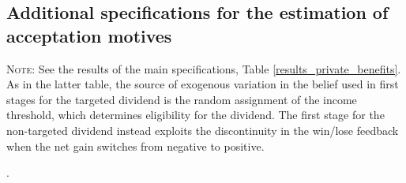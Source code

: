 \documentclass[12pt]{article} %
\begin{document}
\begin{appendices}
\section{Additional specifications for the estimation of acceptation motives \label{subsec:app_motives_other}}

\begin{table}[!htbp] \centering 
  \caption{Effect of self-interest on acceptance: second stages of alternative specifications} 
  \label{tab:alternative_si} 
 {\footnotesize \parbox[t]{\textwidth}{\linespread{1.2}\selectfont \textsc{Note:} See the results of the main specifications, Table \vref{results_private_benefits}. As in the latter table, the source of exogenous variation in the belief used in first stages for the targeted dividend is the random assignment of the income threshold, which determines eligibility for the dividend. The first stage for the non-targeted dividend instead exploits the discontinuity in the win/lose feedback when the net gain switches from negative to positive.} }.\end{table}



\end{appendices}
\end{document}
